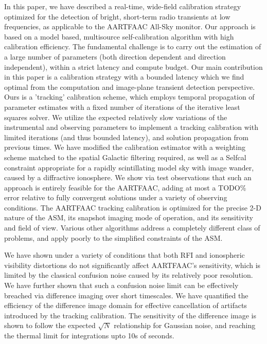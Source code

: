 \documentclass{aa}
\begin{document}
In this  paper, we have  described a real-time, wide-field  calibration strategy
optimized  for the  detection  of  bright, short-term  radio  transients at  low
frequencies, as  applicable to  the AARTFAAC All-Sky  monitor.  Our  approach is
based  on  a  model  based,  multisource self-calibration  algorithm  with  high
calibration efficiency. The fundamental challenge is to carry out the estimation
of  a  large  number  of  parameters (both  direction  dependent  and  direction
independent), within a strict latency  and compute budget. Our main contribution
in this  paper is a  calibration strategy with  a bounded latency which  we find
optimal   from    the   computation   and    image-plane   transient   detection
perspective.  Ours is a  'tracking' calibration  scheme, which  employs temporal
propagation  of parameter estimates  with a  fixed number  of iterations  of the
iterative  least  squares  solver.  We  utilize  the  expected  relatively  slow
variations of the instrumental and  observing parameters to implement a tracking
calibration  with limited iterations  (and thus  bounded latency),  and solution
propagation from previous times. We have modified the calibration estimator with
a weighting scheme  matched to the spatial Galactic  filtering required, as well
as a Selfcal  constraint appropriate for a rapidly  scintillating model sky with
image wander, caused by a  diffractive ionosphere. We show via test observations
that such  an approach is entirely feasible  for the AARTFAAC, adding  at most a
TODO\% error relative to fully convergent solutions under a variety of observing
conditions. The AARTFAAC  tracking calibration is optimized for  the precise 2-D
nature of the  ASM, its snapshot imaging mode of  operation, and its sensitivity
and field of view. Various other algorithms address a completely different class
of problems, and apply poorly to the simplified constraints of the ASM.

We  have shown  under a  variety  of conditions  that both  RFI and  ionospheric
visibility distortions do not significantly affect AARTFAAC's sensitivity, which
is  limited by  the  classical confusion  noise  caused by  its relatively  poor
resolution.  We have  further shown  that such  a confusion  noise limit  can be
effectively  breached via  difference  imaging over  short  timescales. We  have
quantified  the  efficiency  of   the  difference  image  domain  for  effective
cancellation  of   artifacts  introduced   by  the  tracking   calibration.  The
sensitivity of the  difference image is shown to  follow the expected $\sqrt{N}$
relationship for Gaussian noise, and reaching the thermal limit for integrations
upto 10s of seconds.
\end{document}
